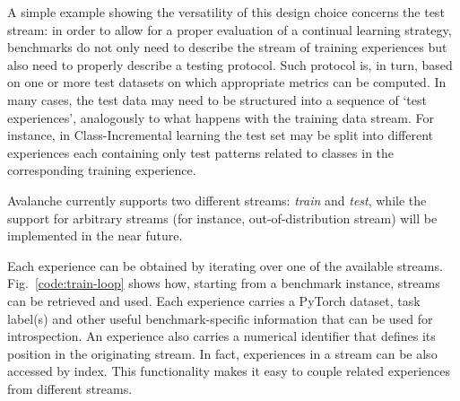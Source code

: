 \documentclass[final]{cvpr}
\theoremstyle{definition}
\begin{document}
A simple example showing the versatility of this design choice concerns the test stream: in order to allow for a proper evaluation of a continual learning strategy, benchmarks do not only need to describe the stream of training experiences but also need to 
properly describe a testing protocol. Such protocol is, in turn, based on one or more test datasets on which appropriate metrics can be computed. %
In many cases, the test data may need to be structured into a sequence of `test experiences', analogously to what happens with the training data stream.
For instance, in Class-Incremental learning %
the test set may be split into different experiences each containing only test patterns %
related to classes %
in the corresponding training experience.


Avalanche currently supports two different streams: \textit{train} and \textit{test}, while the support for arbitrary streams (for instance, out-of-distribution stream) will be implemented in the near future.

Each experience can be obtained by iterating over one of the available streams. Fig.~\ref{code:train-loop} shows how, starting from a benchmark instance, streams can be retrieved and used. Each experience carries a PyTorch dataset, task label(s) and other useful benchmark-specific information that can be used for introspection. An experience also carries a numerical identifier that defines its position in the originating stream. In fact, experiences in a stream can be also accessed by index. This functionality makes it easy to couple related experiences from different streams.
\end{document}
